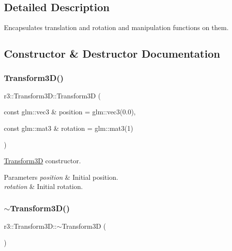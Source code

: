 \subsection{Detailed Description}
Encapsulates translation and rotation and manipulation functions on them. 

\subsection{Constructor \& Destructor Documentation}
\mbox{\label{classr3_1_1_transform3_d_ab43888860ef5d5c124e185124cc681b5}} 
\subsubsection{\texorpdfstring{Transform3\+D()}{Transform3D()}}
{\footnotesize\ttfamily r3\+::\+Transform3\+D\+::\+Transform3D (\begin{DoxyParamCaption}\item[{const glm\+::vec3 \&}]{position = {\ttfamily glm\+:\+:vec3(0.0)},  }\item[{const glm\+::mat3 \&}]{rotation = {\ttfamily glm\+:\+:mat3(1)} }\end{DoxyParamCaption})\hspace{0.3cm}{\ttfamily [explicit]}}



\mbox{\hyperlink{classr3_1_1_transform3_d}{Transform3D}} constructor. 


\begin{DoxyParams}{Parameters}
{\em position} & Initial position. \\
\hline
{\em rotation} & Initial rotation. \\
\hline
\end{DoxyParams}
\mbox{\label{classr3_1_1_transform3_d_acb2850307abbb9733d259dba96d5ec30}} 
\subsubsection{\texorpdfstring{$\sim$\+Transform3\+D()}{~Transform3D()}}
{\footnotesize\ttfamily r3\+::\+Transform3\+D\+::$\sim$\+Transform3D (\begin{DoxyParamCaption}{ }\end{DoxyParamCaption})\hspace{0.3cm}{\ttfamily [default]}}



